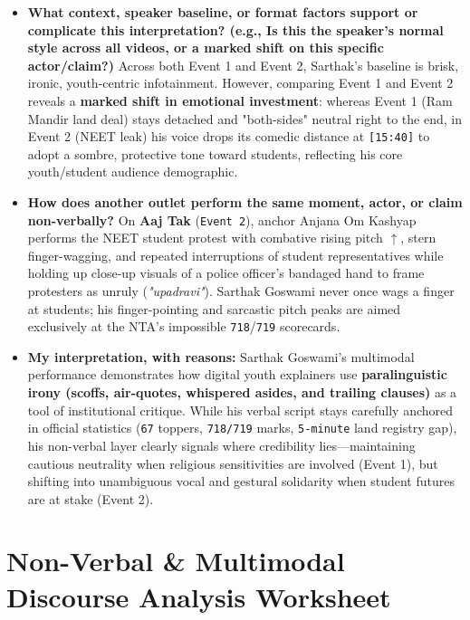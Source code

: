\documentclass[10pt,a4paper]{article}
\begin{document}
\begin{itemize}
  \item \textbf{What context, speaker baseline, or format factors support or complicate this interpretation? (e.g., Is this the speaker's normal style across all videos, or a marked shift on this specific actor/claim?)}
Across both Event 1 and Event 2, Sarthak's baseline is brisk, ironic, youth-centric infotainment. However, comparing Event 1 and Event 2 reveals a \textbf{marked shift in emotional investment}: whereas Event 1 (Ram Mandir land deal) stays detached and "both-sides" neutral right to the end, in Event 2 (NEET leak) his voice drops its comedic distance at \texttt{[15:40]} to adopt a sombre, protective tone toward students, reflecting his core youth/student audience demographic.\par\smallskip
  \item \textbf{How does another outlet perform the same moment, actor, or claim non-verbally?}
On \textbf{Aaj Tak} (\texttt{Event 2}), anchor Anjana Om Kashyap performs the NEET student protest with combative rising pitch \texttt{$\uparrow$}, stern finger-wagging, and repeated interruptions of student representatives while holding up close-up visuals of a police officer's bandaged hand to frame protesters as unruly (\textit{"upadravi"}). Sarthak Goswami never once wags a finger at students; his finger-pointing and sarcastic pitch peaks are aimed exclusively at the NTA's impossible \texttt{718}/\texttt{719} scorecards.\par\smallskip
  \item \textbf{My interpretation, with reasons:}
Sarthak Goswami's multimodal performance demonstrates how digital youth explainers use \textbf{paralinguistic irony (scoffs, air-quotes, whispered asides, and trailing clauses)} as a tool of institutional critique. While his verbal script stays carefully anchored in official statistics (\texttt{67} toppers, \texttt{718/719} marks, \texttt{5-minute} land registry gap), his non-verbal layer clearly signals where credibility lies---maintaining cautious neutrality when religious sensitivities are involved (Event 1), but shifting into unambiguous vocal and gestural solidarity when student futures are at stake (Event 2).\par\smallskip
\end{itemize}
\newpage
\section*{Non-Verbal \& Multimodal Discourse Analysis Worksheet}
\end{document}
